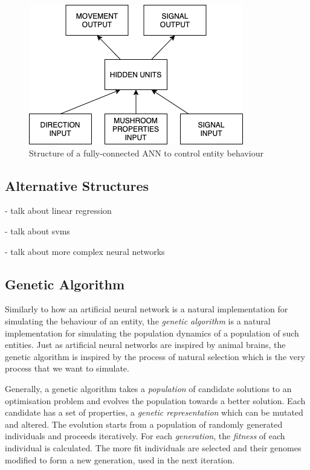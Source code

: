 \documentclass[12pt,a4paper,twoside,openright]{report}
\begin{document}
\begin{figure}[t]
  \centering
  \includegraphics[width=.6\linewidth]{figs/NeuralNets}
  \caption{Structure of a fully-connected ANN to control entity behaviour}
  \label{fig:neuralnet}
\end{figure}

\subsection{Alternative Structures}

- talk about linear regression

- talk about svms

- talk about more complex neural networks

\subsection{Genetic Algorithm}\label{section:genetic}

Similarly to how an artificial neural network is a natural implementation for simulating the behaviour of an entity, the \emph{genetic algorithm} is a natural implementation for simulating the population dynamics of a population of such entities. Just as artificial neural networks are inspired by animal brains, the genetic algorithm is inspired by the process of natural selection which is the very process that we want to simulate. 

Generally, a genetic algorithm takes a \emph{population} of candidate solutions to an optimisation problem and evolves the population towards a better solution. Each candidate has a set of properties, a \emph{genetic representation} which can be mutated and altered. The evolution starts from a population of randomly generated individuals and proceeds iteratively. For each \emph{generation}, the \emph{fitness} of each individual is calculated. The more fit individuals are selected and their genomes modified to form a new generation, used in the next iteration.
\end{document}
